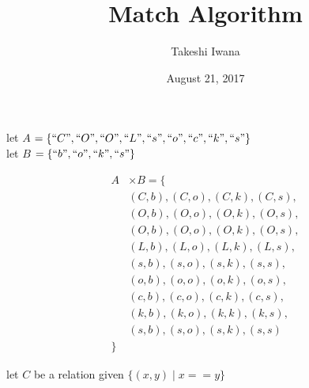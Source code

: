 \documentclass{article}
\title{Match Algorithm}
\author{Takeshi Iwana} %
\date{August 21, 2017}
\begin{document}
  \begin{large}
  \maketitle

  \begin{flushleft}
    let $A$ $ = \{``C", ``O", ``O", ``L", ``s", ``o", ``c", ``k", ``s" \}$\\
    let $B$ $ = \{``b", ``o", ``k", ``s"\}$
  \end{flushleft}
  \begin{align*}
    A &\times B = \{ \\
    & (C, b), (C, o), (C, k), (C, s),\\
    & (O, b), (O, o), (O, k), (O, s),\\
    & (O, b), (O, o), (O, k), (O, s),\\
    & (L, b), (L, o), (L, k), (L, s),\\
    & (s, b), (s, o), (s, k), (s, s),\\
    & (o, b), (o, o), (o, k), (o, s),\\
    & (c, b), (c, o), (c, k), (c, s),\\
    & (k, b), (k, o), (k, k), (k, s),\\
    & (s, b), (s, o), (s, k), (s, s)\\
    \}
  \end{align*}
  \begin{flushleft}
    let $C$ be a relation given $\{(x, y) \mid x == y \}$
  \end{flushleft}
  \end{large}
  
\end{document}
